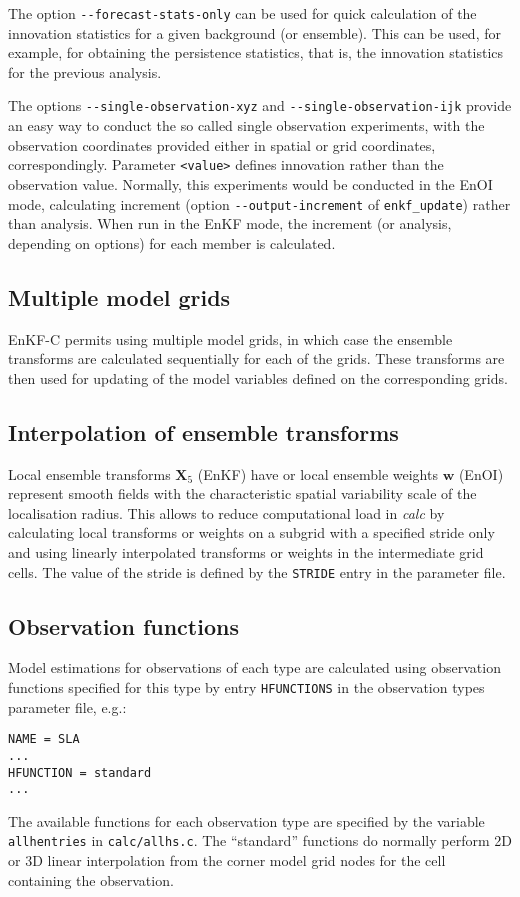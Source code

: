 \documentclass[11pt]{report}
\newcommand{\mb} {\mathbf}
\begin{document}
The option \verb|--forecast-stats-only| can be used for quick calculation of the innovation statistics for a given background (or ensemble).
This can be used, for example, for obtaining the persistence statistics, that is, the innovation statistics for the previous analysis.

The options \verb|--single-observation-xyz| and \verb|--single-observation-ijk| provide an easy way to conduct the so called single observation experiments, with the observation coordinates provided either in spatial or grid coordinates, correspondingly.
Parameter \verb|<value>| defines innovation rather than the observation value.
Normally, this experiments would be conducted in the EnOI mode, calculating increment (option \verb|--output-increment| of \verb|enkf_update|) rather than analysis.
When run in the EnKF mode, the increment (or analysis, depending on options) for each member is calculated.

\subsection{Multiple model grids}

EnKF-C permits using multiple model grids, in which case the ensemble transforms are calculated sequentially for each of the grids.
These transforms are then used for updating of the model variables defined on the corresponding grids.

\subsection{Interpolation of ensemble transforms}

Local ensemble transforms $\mb X_5$ (EnKF) have or local ensemble weights $\mb w$ (EnOI) represent smooth fields with the characteristic spatial variability scale of the localisation radius.
This allows to reduce computational load in \emph{calc} by calculating local transforms or weights on a subgrid with a specified stride only and using linearly interpolated transforms or weights in the intermediate grid cells.
The value of the stride is defined by the \verb|STRIDE| entry in the parameter file.

\subsection{Observation functions}
\label{sec:hfunctions}

Model estimations for observations of each type are calculated using observation functions specified for this type by entry \verb|HFUNCTIONS| in the observation types parameter file, e.g.:
\begin{Verbatim}[frame=single,fontsize=\footnotesize]
NAME = SLA
...
HFUNCTION = standard
...
\end{Verbatim}
The available functions for each observation type are specified by the variable \verb|allhentries| in \verb|calc/allhs.c|.
The ``standard'' functions do normally perform 2D or 3D linear interpolation from the corner model grid nodes for the cell containing the observation.
\end{document}
